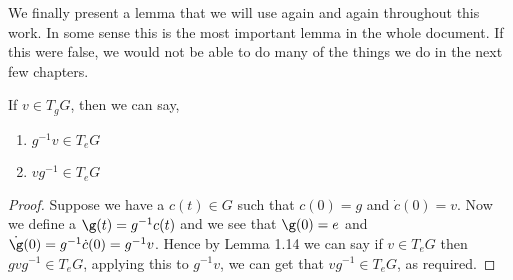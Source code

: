 \noindent
We finally present a lemma that we will use again and again throughout this work. In some sense this is the most important lemma in the whole document. If this were false, we would not be able to do many of the things we do in the next few chapters.
\begin{nlemma}
  If $v \in T_gG$, then we can say,
  \begin{enumerate}
    \item $g^{-1}v \in T_eG$
    \item $vg^{-1} \in T_eG$
  \end{enumerate}
\end{nlemma}
{\begin{proof}
  Suppose we have a $c(t) \in G$ such that $c(0) = g$ and $\dot c(0) = v$. Now we define a $\g(t) = g^{-1}c(t)$ and we see that $\g (0) = e$ and $\dot\g(0) = g^{-1}\dot c(0) = g^{-1}v$. Hence by Lemma 1.14 we can say if $v \in T_eG$ then $gvg^{-1} \in T_eG$, applying this to $g^{-1}v$, we can get that $vg^{-1} \in T_eG$, as required.
\end{proof} }
